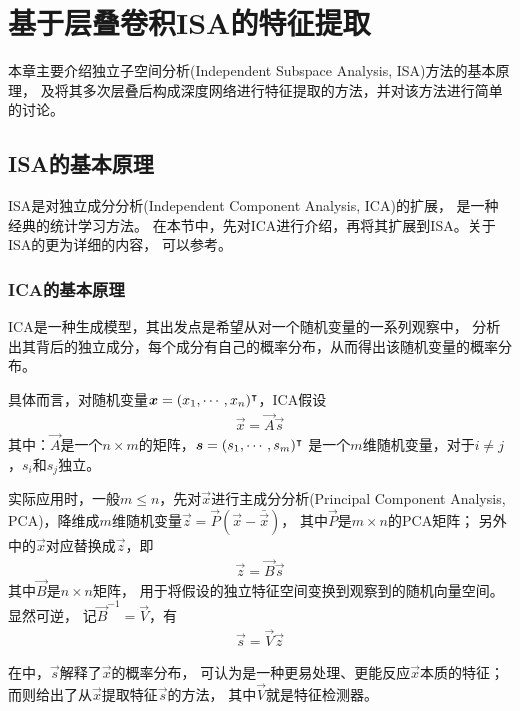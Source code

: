 
\chapter{基于层叠卷积ISA的特征提取\label{chap:ISA}}
本章主要介绍独立子空间分析(Independent Subspace Analysis, ISA)方法的基本原理，
及将其多次层叠后构成深度网络进行特征提取的方法，并对该方法进行简单的讨论。

\section{ISA的基本原理}
ISA是对独立成分分析(Independent Component Analysis, ICA)的扩展，
是一种经典的统计学习方法。
在本节中，先对ICA进行介绍，再将其扩展到ISA。关于ISA的更为详细的内容，
可以参考\cite{hyvarinen2009natural}。


\subsection{ICA的基本原理}
ICA是一种生成模型，其出发点是希望从对一个随机变量的一系列观察中，
分析出其背后的独立成分，每个成分有自己的概率分布，从而得出该随机变量的概率分布。

具体而言，对随机变量$\boldsymbol{x} = (x_1, \cdots, x_n)^\intercal$，ICA假设
\begin{eqnarray}
    \vec{x} = \vec{A}\vec{s}
    \label{eqn:ica:0}
\end{eqnarray}
其中：$\vec{A}$是一个$n\times m$的矩阵，$\boldsymbol{s}=(s_1,\cdots,s_m)^\intercal$
是一个$m$维随机变量，对于$i\neq j$，$s_i$和$s_j$独立。

实际应用时，一般$m \le n$，先对$\vec{x}$进行主成分分析(Principal Component
Analysis, PCA)，降维成$m$维随机变量$\vec{z}=\vec{P}(\vec{x}-\bar{\vec{x}})$，
其中$\vec{P}$是$m \times n$的PCA矩阵；
另外中的$\vec{x}$对应替换成$\vec{z}$，即
\begin{eqnarray}
    \vec{z} = \vec{B}\vec{s}
    \label{eqn:ica:1}
\end{eqnarray}
其中$\vec{B}$是$n\times n$矩阵，
用于将假设的独立特征空间变换到观察到的随机向量空间。显然可逆，
记$\vec{B}^{-1}=\vec{V}$，有
\begin{eqnarray}
    \vec{s} = \vec{V}\vec{z}
    \label{eqn:ica:2}
\end{eqnarray}

在中，$\vec{s}$解释了$\vec{x}$的概率分布，
可认为是一种更易处理、更能反应$\vec{x}$本质的特征；
而则给出了从$\vec{x}$提取特征$\vec{s}$的方法，
其中$\vec{V}$就是特征检测器。

